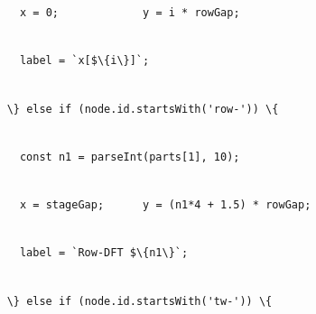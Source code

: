 \documentclass[
]{article}
\newcommand{\passthrough}[1]{#1}
\begin{document}
\passthrough{\lstinline!      !}\passthrough{\lstinline!x!}\passthrough{\lstinline! !}\passthrough{\lstinline!=!}\passthrough{\lstinline! !}\passthrough{\lstinline!0;!}\passthrough{\lstinline!             !}\passthrough{\lstinline!y!}\passthrough{\lstinline! !}\passthrough{\lstinline!=!}\passthrough{\lstinline! !}\passthrough{\lstinline!i!}\passthrough{\lstinline! !}\passthrough{\lstinline!*!}\passthrough{\lstinline! !}\passthrough{\lstinline!rowGap!}\passthrough{\lstinline!;!}\strut \\
\passthrough{\lstinline!      !}\passthrough{\lstinline!label!}\passthrough{\lstinline! !}\passthrough{\lstinline!=!}\passthrough{\lstinline! !}\passthrough{\lstinline!`x[$\{i\}]`;!}\strut \\
\passthrough{\lstinline!    !}\passthrough{\lstinline!\}!}\passthrough{\lstinline! !}\passthrough{\lstinline!else!}\passthrough{\lstinline! !}\passthrough{\lstinline!if!}\passthrough{\lstinline! !}\passthrough{\lstinline!(!}\passthrough{\lstinline!node.id.startsWith!}\passthrough{\lstinline!('row-'))!}\passthrough{\lstinline! !}\passthrough{\lstinline!\{!}\strut \\
\passthrough{\lstinline!      !}\passthrough{\lstinline!const!}\passthrough{\lstinline! !}\passthrough{\lstinline!n1!}\passthrough{\lstinline! !}\passthrough{\lstinline!=!}\passthrough{\lstinline! !}\passthrough{\lstinline!parseInt!}\passthrough{\lstinline!(parts[1],!}\passthrough{\lstinline! !}\passthrough{\lstinline!10);!}\strut \\
\passthrough{\lstinline!      !}\passthrough{\lstinline!x!}\passthrough{\lstinline! !}\passthrough{\lstinline!=!}\passthrough{\lstinline! !}\passthrough{\lstinline!stageGap!}\passthrough{\lstinline!;!}\passthrough{\lstinline!      !}\passthrough{\lstinline!y!}\passthrough{\lstinline! !}\passthrough{\lstinline!=!}\passthrough{\lstinline! !}\passthrough{\lstinline!(n1*4!}\passthrough{\lstinline! !}\passthrough{\lstinline!+!}\passthrough{\lstinline! !}\passthrough{\lstinline!1.5)!}\passthrough{\lstinline! !}\passthrough{\lstinline!*!}\passthrough{\lstinline! !}\passthrough{\lstinline!rowGap!}\passthrough{\lstinline!;!}\strut \\
\passthrough{\lstinline!      !}\passthrough{\lstinline!label!}\passthrough{\lstinline! !}\passthrough{\lstinline!=!}\passthrough{\lstinline! !}\passthrough{\lstinline!`Row-DFT!}\passthrough{\lstinline! !}\passthrough{\lstinline!$\{n1\}`;!}\strut \\
\passthrough{\lstinline!    !}\passthrough{\lstinline!\}!}\passthrough{\lstinline! !}\passthrough{\lstinline!else!}\passthrough{\lstinline! !}\passthrough{\lstinline!if!}\passthrough{\lstinline! !}\passthrough{\lstinline!(!}\passthrough{\lstinline!node.id.startsWith!}\passthrough{\lstinline!('!}\passthrough{\lstinline!tw!}\passthrough{\lstinline!-'))!}\passthrough{\lstinline! !}\passthrough{\lstinline!\{!}\strut \\
\end{document}
